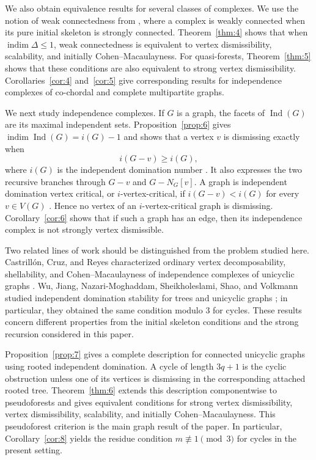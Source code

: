\documentclass[11pt]{amsart}
\DeclareMathOperator{\indim}{indim}
\DeclareMathOperator{\Ind}{Ind}
\theoremstyle{definition}
\begin{document}
	We also obtain equivalence results for several classes of complexes. We use the notion of weak connectedness from \cite{Namiq2026ICM}, where a complex is weakly connected when its pure initial skeleton is strongly connected. Theorem~\ref{thm:4} shows that when $\indim\Delta\leq1$, weak connectedness is equivalent to vertex dismissibility, scalability, and initially Cohen--Macaulayness. For quasi-forests, Theorem~\ref{thm:5} shows that these conditions are also equivalent to strong vertex dismissibility. Corollaries~\ref{cor:4} and~\ref{cor:5} give corresponding results for independence complexes of co-chordal and complete multipartite graphs.
	
	We next study independence complexes. If $G$ is a graph, the facets of $\Ind(G)$ are its maximal independent sets. Proposition~\ref{prop:6} gives $\indim\Ind(G)=i(G)-1$ and shows that a vertex $v$ is dismissing exactly when
	\[
	i(G-v)\geq i(G),
	\]
	where $i(G)$ is the independent domination number \cite{Haynes1998}. It also expresses the two recursive branches through $G-v$ and $G-N_G[v]$. A graph is independent domination vertex critical, or $i$-vertex-critical, if $i(G-v)<i(G)$ for every $v\in V(G)$ \cite{AnanchuenEtAl2018,EdwardsMacGillivray2012}. Hence no vertex of an $i$-vertex-critical graph is dismissing. Corollary~\ref{cor:6} shows that if such a graph has an edge, then its independence complex is not strongly vertex dismissible.
	
	Two related lines of work should be distinguished from the problem studied here. Castrill\'on, Cruz, and Reyes characterized ordinary vertex decomposability, shellability, and Cohen--Macaulayness of independence complexes of unicyclic graphs \cite{CastrillonCruzReyes2016}. Wu, Jiang, Nazari-Moghaddam, Sheikholeslami, Shao, and Volkmann studied independent domination stability for trees and unicyclic graphs \cite{WuEtAl2019}; in particular, they obtained the same condition modulo $3$ for cycles. These results concern different properties from the initial skeleton conditions and the strong recursion considered in this paper.
	
	Proposition~\ref{prop:7} gives a complete description for connected unicyclic graphs using rooted independent domination. A cycle of length $3q+1$ is the cyclic obstruction unless one of its vertices is dismissing in the corresponding attached rooted tree. Theorem~\ref{thm:6} extends this description componentwise to pseudoforests and gives equivalent conditions for strong vertex dismissibility, vertex dismissibility, scalability, and initially Cohen--Macaulayness. This pseudoforest criterion is the main graph result of the paper. In particular, Corollary~\ref{cor:8} yields the residue condition $m\not\equiv1\pmod3$ for cycles in the present setting.
	
\end{document}
